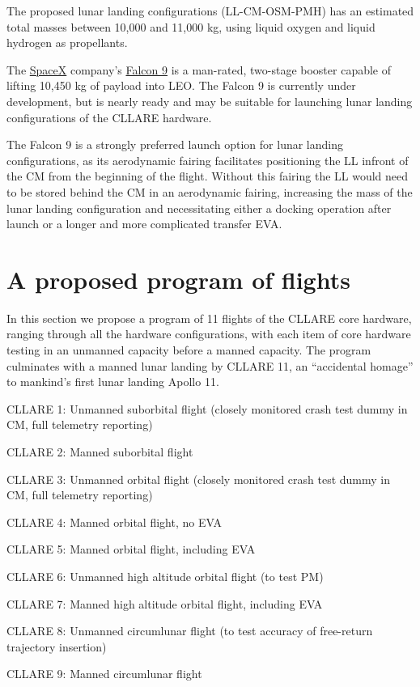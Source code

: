 \documentclass{report}
\begin{document}
The proposed lunar landing configurations (LL-CM-OSM-PMH) has an estimated total masses between 10,000 and 11,000 kg, using liquid oxygen and liquid hydrogen as propellants.

The \href{http://spacex.com}{SpaceX} company's \href{http://spacex.com/falcon9.php}{Falcon 9} is a man-rated, two-stage booster capable of lifting 10,450 kg of payload into LEO.  The Falcon 9 is currently under development, but is nearly ready and may be suitable for launching lunar landing configurations of the CLLARE hardware.

The Falcon 9 is a strongly preferred launch option for lunar landing configurations, as its aerodynamic fairing facilitates positioning the LL infront of the CM from the beginning of the flight.  Without this fairing the LL would need to be stored behind the CM in an aerodynamic fairing, increasing the mass of the lunar landing configuration and necessitating either a docking operation after launch or a longer and more complicated transfer EVA.

\section{A proposed program of flights}

In this section we propose a program of 11 flights of the CLLARE core hardware, ranging through all the hardware configurations, with each item of core hardware testing in an unmanned capacity before a manned capacity.  The program culminates with a manned lunar landing by CLLARE 11, an ``accidental homage'' to mankind's first lunar landing Apollo 11.

CLLARE 1: Unmanned suborbital flight (closely monitored crash test dummy in CM, full telemetry reporting)

CLLARE 2: Manned suborbital flight

CLLARE 3: Unmanned orbital flight (closely monitored crash test dummy in CM, full telemetry reporting)

CLLARE 4: Manned orbital flight, no EVA

CLLARE 5: Manned orbital flight, including EVA

CLLARE 6: Unmanned high altitude orbital flight (to test PM)

CLLARE 7: Manned high altitude orbital flight, including EVA

CLLARE 8: Unmanned circumlunar flight (to test accuracy of free-return trajectory insertion)

CLLARE 9: Manned circumlunar flight
\end{document}
